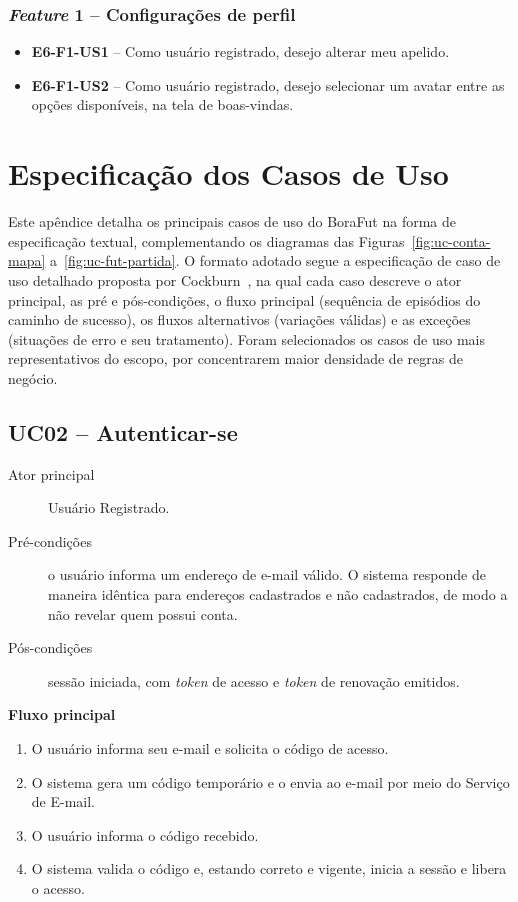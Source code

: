 \begin{apendicesenv}
    \subsection*{\textit{Feature} 1 -- Configurações de perfil}
    \begin{itemize}
        \item \textbf{E6-F1-US1} -- Como usuário registrado, desejo alterar meu apelido.
        \item \textbf{E6-F1-US2} -- Como usuário registrado, desejo selecionar um avatar entre as opções disponíveis, na tela de boas-vindas.
    \end{itemize}

\chapter{Especificação dos Casos de Uso}
    \label{apendice:casos-uso}

    Este apêndice detalha os principais casos de uso do BoraFut na forma de especificação textual, complementando os diagramas das Figuras~\ref{fig:uc-conta-mapa} a~\ref{fig:uc-fut-partida}. O formato adotado segue a especificação de caso de uso detalhado proposta por Cockburn~\cite{cockburn2001}, na qual cada caso descreve o ator principal, as pré e pós-condições, o fluxo principal (sequência de episódios do caminho de sucesso), os fluxos alternativos (variações válidas) e as exceções (situações de erro e seu tratamento). Foram selecionados os casos de uso mais representativos do escopo, por concentrarem maior densidade de regras de negócio.

    \section*{UC02 -- Autenticar-se}
        \begin{description}
            \item[Ator principal] Usuário Registrado.
            \item[Pré-condições] o usuário informa um endereço de e-mail válido. O sistema responde de maneira idêntica para endereços cadastrados e não cadastrados, de modo a não revelar quem possui conta.
            \item[Pós-condições] sessão iniciada, com \textit{token} de acesso e \textit{token} de renovação emitidos.
        \end{description}

        \noindent\textbf{Fluxo principal}
        \begin{enumerate}
            \item O usuário informa seu e-mail e solicita o código de acesso.
            \item O sistema gera um código temporário e o envia ao e-mail por meio do Serviço de E-mail.
            \item O usuário informa o código recebido.
            \item O sistema valida o código e, estando correto e vigente, inicia a sessão e libera o acesso.
        \end{enumerate}


\end{apendicesenv}
